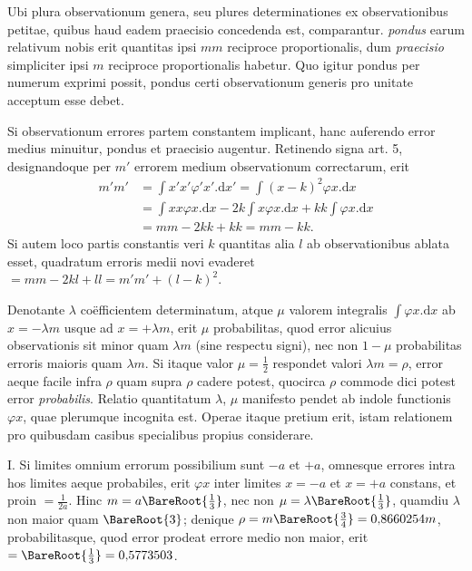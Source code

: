 Ubi plura observationum genera, seu plures determinationes ex observationibus petitae, quibus haud eadem praecisio concedenda est, comparantur. \textit{pondus} earum relativum nobis erit quantitas ipsi \(mm\) reciproce proportionalis, dum \textit{praecisio} simpliciter ipsi \(m\) reciproce proportionalis habetur. Quo igitur pondus per numerum exprimi possit, pondus certi observationum generis pro unitate acceptum esse debet.

Si observationum errores partem constantem implicant, hanc auferendo error medius minuitur, pondus et praecisio augentur. Retinendo signa art. 5, designandoque per \(m'\) errorem medium observationum correctarum, erit
\[
\begin{aligned}
m'm'&=\int x'x'\varphi'x'.\mathrm{d}x'=\int(x-k)^2\varphi x.\mathrm{d}x\\
&=\int xx\varphi x.\mathrm{d}x-2k\int x\varphi x.\mathrm{d}x+kk\int\varphi x.\mathrm{d}x\\
&=mm-2kk+kk=mm-kk.
\end{aligned}
\]
Si autem loco partis constantis veri \(k\) quantitas alia \(l\) ab observationibus ablata esset, quadratum erroris medii novi evaderet \(=mm-2kl+ll=m'm'+(l-k)^2\).

Denotante \(\lambda\) coëfficientem determinatum, atque \(\mu\) valorem integralis \(\int\varphi x.\mathrm{d}x\) ab \(x=-\lambda m\) usque ad \(x=+\lambda m\), erit \(\mu\) probabilitas, quod error alicuius observationis sit minor quam \(\lambda m\) (sine respectu signi), nec non \(1-\mu\) probabilitas erroris maioris quam \(\lambda m\). Si itaque valor \(\mu=\tfrac12\) respondet valori \(\lambda m=\rho\), error aeque facile infra \(\rho\) quam supra \(\rho\) cadere potest, quocirca \(\rho\) commode dici potest error \textit{probabilis}. Relatio quantitatum \(\lambda\), \(\mu\) manifesto pendet ab indole functionis \(\varphi x\), quae plerumque incognita est. Operae itaque pretium erit, istam relationem pro quibusdam casibus specialibus propius considerare.

I. Si limites omnium errorum possibilium sunt \(-a\) et \(+a\), omnesque errores intra hos limites aeque probabiles, erit \(\varphi x\) inter limites \(x=-a\) et \(x=+a\) constans, et proin \(=\tfrac{1}{2a}\). Hinc \(m=a\BareRoot{\tfrac13}\), nec non \(\mu=\lambda\BareRoot{\tfrac13}\), quamdiu \(\lambda\) non maior quam \(\BareRoot{3}\); denique \(\rho=m\BareRoot{\tfrac34}=0{,}8660254m\), probabilitasque, quod error prodeat errore medio non maior, erit \(=\BareRoot{\tfrac13}=0{,}5773503\).

